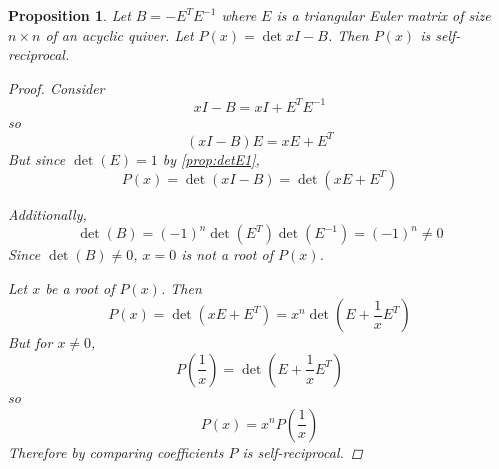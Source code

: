 \documentclass{amsart}
\theoremstyle{theorem}
\theoremstyle{theorem*}
\newtheorem{proposition}[theorem]{Proposition}
\theoremstyle{definition}
\begin{document}
\begin{proposition}
    Let $B = - E^T E^{-1}$ where $E$ is a triangular Euler
    matrix of size $n \times n$ of an acyclic quiver. Let $P(x) = \det{xI - B}$.
    Then $P(x)$ is self-reciprocal.
    \begin{proof}
        Consider
        $$xI - B = xI + E^T E^{-1}$$
        so
        $$(xI - B)E = xE + E^T$$
        But since $\det(E) = 1$ by \ref{prop:detE1},
        $$P(x) = \det(xI - B) = \det(xE + E^T)$$

        Additionally,
        $$\det(B) = (-1)^n \det(E^T) \det(E^{-1}) = (-1)^n \neq 0$$
        Since $\det(B) \neq 0$,
        $x = 0$ is not a root of $P(x)$.

        Let $x$ be a root of $P(x)$. Then
        $$P(x) = \det(xE+E^T) = x^n \det \left(E + \frac{1}{x} E^T \right)$$
        But for $x \neq 0$,
        $$P\left(\frac{1}{x}\right) = \det\left(E +  \frac{1}{x} E^T\right)$$
        so
        $$P(x) = x^n P\left(\frac{1}{x}\right)$$
        Therefore by comparing coefficients $P$ is self-reciprocal.
    \end{proof}
\end{proposition}
\end{document}
